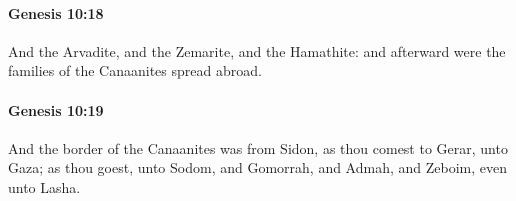 		\paragraph{Genesis 10:18} %
			\label{GENESIS-10-18}

			And the Arvadite, and the Zemarite, and the Hamathite: and afterward were the families of the Canaanites spread abroad.


		\paragraph{Genesis 10:19} %
			\label{GENESIS-10-19}

			And the border of the Canaanites was from Sidon, as thou comest to Gerar, unto Gaza; as thou goest, unto Sodom, and Gomorrah, and Admah, and Zeboim, even unto Lasha.


